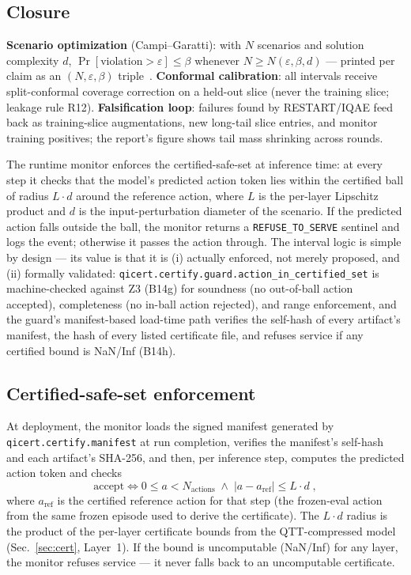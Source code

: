 \documentclass[conference,10pt]{IEEEtran}
\begin{document}
\subsection{Closure}
\textbf{Scenario optimization} (Campi--Garatti): with $N$ scenarios and
solution complexity $d$, $\Pr[\text{violation}>\varepsilon]\le\beta$ whenever
$N \ge N(\varepsilon,\beta,d)$ --- printed per claim as an $(N,\varepsilon,\beta)$
triple~\cite{campi}. \textbf{Conformal calibration}: all intervals receive
split-conformal coverage correction on a held-out slice (never the training
slice; leakage rule R12). \textbf{Falsification loop}: failures found by
RESTART/IQAE feed back as training-slice augmentations, new long-tail slice
entries, and monitor training positives; the report's figure shows tail mass
shrinking across rounds.


The runtime monitor enforces the certified-safe-set at inference time: at every
step it checks that the model's predicted action token lies within the
certified ball of radius $L{\cdot}d$ around the reference action, where $L$ is
the per-layer Lipschitz product and $d$ is the input-perturbation diameter of
the scenario. If the predicted action falls outside the ball, the monitor
returns a \texttt{REFUSE\_TO\_SERVE} sentinel and logs the event; otherwise it
passes the action through. The interval logic is simple by design — its value
is that it is (i) actually enforced, not merely proposed, and (ii) formally
validated: \texttt{qicert.certify.guard.action\_in\_certified\_set} is
machine-checked against Z3 (B14g) for soundness (no out-of-ball action accepted),
completeness (no in-ball action rejected), and range enforcement, and the
guard's manifest-based load-time path verifies the self-hash of
every artifact's manifest, the hash of every listed certificate file, and
refuses service if any certified bound is NaN/Inf (B14h).

\subsection{Certified-safe-set enforcement}

At deployment, the monitor loads the signed manifest generated by
\texttt{qicert.certify.manifest} at run completion, verifies the manifest's
self-hash and each artifact's SHA-256, and then, per inference step, computes
the predicted action token and checks
\[\text{accept} \iff 0\le a < N_{\text{actions}} \;\wedge\; |a - a_{\text{ref}}| \le L{\cdot}d \;,\]where $a_{\text{ref}}$ is the certified reference action for that step (the
frozen-eval action from the same frozen episode used to derive the certificate).
The $L{\cdot}d$ radius is the product of the per-layer certificate bounds from
the QTT-compressed model (Sec.~\ref{sec:cert}, Layer~1). If the bound is
uncomputable (NaN/Inf) for any layer, the monitor refuses service --- it never
falls back to an uncomputable certificate.
\end{document}
